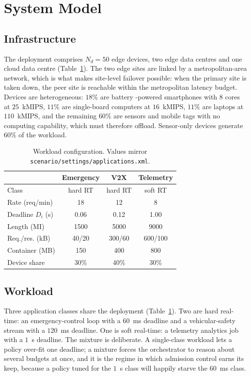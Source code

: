 \documentclass[journal,10pt]{IEEEtran}
\begin{document}
\section{System Model}
\label{sec:model}

\subsection{Infrastructure}
The deployment comprises $N_d=50$ edge devices, two edge data centres and one
cloud data centre (Table~\ref{tab:params}). The two edge sites are linked by a
metropolitan-area network, which is what makes site-level failover possible:
when the primary site is taken down, the peer site is reachable within the
metropolitan latency budget. Devices are heterogeneous: $18\%$ are battery
-powered smartphones with $8$ cores at $25$~kMIPS, $11\%$ are single-board
computers at $16$~kMIPS, $11\%$ are laptops at $110$~kMIPS, and the remaining
$60\%$ are sensors and mobile tags with no computing capability, which must
therefore offload. Sensor-only devices generate $60\%$ of the workload.

\begin{table}[t]
\centering
\footnotesize
\caption{Workload configuration. Values mirror
\texttt{scenario/settings/applications.xml}.}
\label{tab:params}
\begin{tabular}{@{}lccc@{}}
\toprule
 & Emergency & V2X & Telemetry\\
\midrule
Class & hard RT & hard RT & soft RT\\
Rate (req/min) & 18 & 12 & 8\\
Deadline $D_i$ (s) & 0.06 & 0.12 & 1.00\\
Length (MI) & 1500 & 5000 & 9000\\
Req./res. (kB) & 40/20 & 300/60 & 600/100\\
Container (MB) & 150 & 400 & 800\\
Device share & 30\% & 40\% & 30\%\\
\bottomrule
\end{tabular}
\end{table}

\subsection{Workload}
Three application classes share the deployment
(Table~\ref{tab:params}). Two are hard real-time: an emergency-control loop with
a $60$~ms deadline and a vehicular-safety stream with a $120$~ms deadline. One is
soft real-time: a telemetry analytics job with a $1$~s deadline. The mixture is
deliberate. A single-class workload lets a policy over-fit one deadline; a
mixture forces the orchestrator to reason about several budgets at once, and it
is the regime in which admission control earns its keep, because a policy tuned
for the $1$~s class will happily starve the $60$~ms class.
\end{document}
